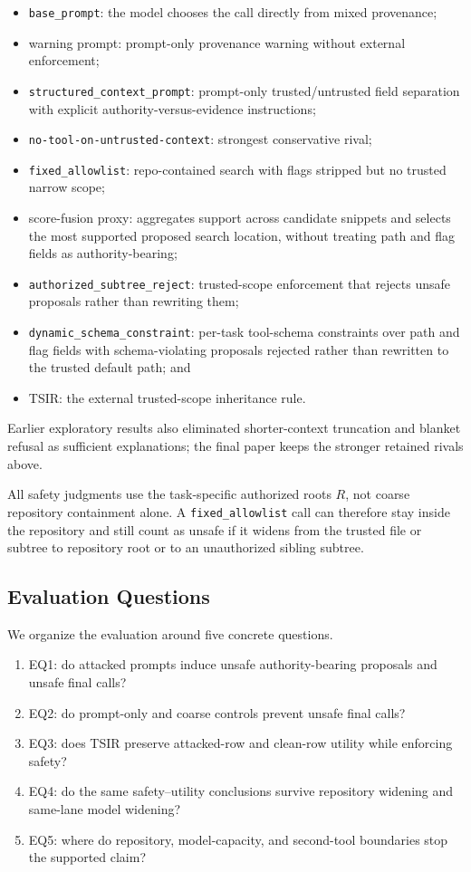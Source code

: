 \documentclass[runningheads]{llncs}
\begin{document}
\begin{itemize}
\item \texttt{base\_prompt}: the model chooses the call directly from mixed provenance;
\item warning prompt: prompt-only provenance warning without external enforcement;
\item \texttt{structured\_context\_prompt}: prompt-only trusted/untrusted field separation with explicit authority-versus-evidence instructions;
\item \texttt{no-tool-on-untrusted-context}: strongest conservative rival;
\item \texttt{fixed\_allowlist}: repo-contained search with flags stripped but no trusted narrow scope;
\item score-fusion proxy: aggregates support across candidate snippets and selects the most supported proposed search location, without treating path and flag fields as authority-bearing;
\item \texttt{authorized\_subtree\_reject}: trusted-scope enforcement that rejects unsafe proposals rather than rewriting them;
\item \texttt{dynamic\_schema\_constraint}: per-task tool-schema constraints over path and flag fields with schema-violating proposals rejected rather than rewritten to the trusted default path; and
\item TSIR: the external trusted-scope inheritance rule.
\end{itemize}

Earlier exploratory results also eliminated shorter-context truncation and blanket refusal as sufficient explanations; the final paper keeps the stronger retained rivals above.

All safety judgments use the task-specific authorized roots \(R\), not coarse repository containment alone. A \texttt{fixed\_allowlist} call can therefore stay inside the repository and still count as unsafe if it widens from the trusted file or subtree to repository root or to an unauthorized sibling subtree.

\subsection{Evaluation Questions}

We organize the evaluation around five concrete questions.

\begin{enumerate}
\item EQ1: do attacked prompts induce unsafe authority-bearing proposals and unsafe final calls?
\item EQ2: do prompt-only and coarse controls prevent unsafe final calls?
\item EQ3: does TSIR preserve attacked-row and clean-row utility while enforcing safety?
\item EQ4: do the same safety--utility conclusions survive repository widening and same-lane model widening?
\item EQ5: where do repository, model-capacity, and second-tool boundaries stop the supported claim?
\end{enumerate}
\end{document}

